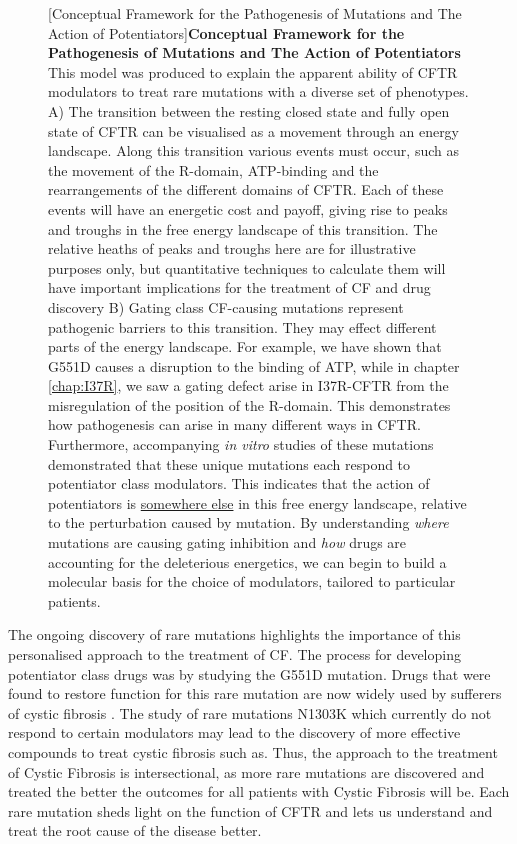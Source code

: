 \begin{figure}
	[Conceptual Framework for the Pathogenesis of Mutations and The Action of Potentiators]{\textbf{Conceptual Framework for the Pathogenesis of Mutations and The Action of Potentiators}{ This model was produced to explain the apparent ability of CFTR modulators to treat rare mutations with a diverse set of phenotypes. A) The transition between the resting closed state and fully open state of CFTR can be visualised as a movement through an energy landscape. Along this transition various events must occur, such as the movement of the R-domain, ATP-binding and the rearrangements of the different domains of CFTR. Each of these events will have an energetic cost and payoff, giving rise to peaks and troughs in the free energy landscape of this transition. The relative heaths of peaks and troughs here are for illustrative purposes only, but quantitative techniques to calculate them will have important implications for the treatment of CF and drug discovery B) Gating class CF-causing mutations represent pathogenic barriers to this transition. They may effect different parts of the energy landscape. For example, we have shown that G551D causes a disruption to the binding of ATP, while in chapter \ref{chap:I37R}, we saw a gating defect arise in I37R-CFTR from the misregulation of the position of the R-domain. This demonstrates how pathogenesis can arise in many different ways in CFTR. Furthermore, accompanying \textit{in vitro} studies of these mutations demonstrated that these unique mutations each respond to potentiator class modulators. This indicates that the action of potentiators is \underline{somewhere else} in this free energy landscape, relative to the perturbation caused by mutation. By understanding \textit{where} mutations are causing gating inhibition and \textit{how} drugs are accounting for the deleterious energetics, we can begin to build a molecular basis for the choice of modulators, tailored to particular patients.}}
\end{figure}

The ongoing discovery of rare mutations highlights the importance of this personalised approach to the treatment of CF. The process for developing potentiator class drugs was by studying the G551D mutation. Drugs that were found to restore function for this rare mutation are now widely used by sufferers of cystic fibrosis \cite{}. The study of rare mutations N1303K which currently do not respond to certain modulators may lead to the discovery of more effective compounds to treat cystic fibrosis such as. Thus, the approach to the treatment of Cystic Fibrosis is intersectional, as more rare mutations are discovered and treated the better the outcomes for all patients with Cystic Fibrosis will be. Each rare mutation sheds light on the function of CFTR and lets us understand and treat the root cause of the disease better.


